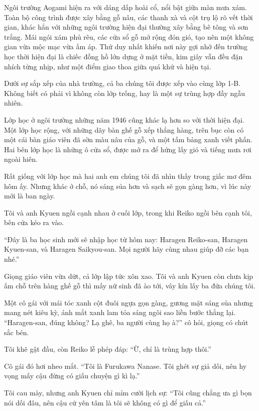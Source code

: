 \documentclass[../main.tex]{subfiles}
\begin{document}
Ngôi trường Aogami hiện ra với dáng dấp hoài cổ, nổi bật giữa màn mưa xám. Toàn bộ công trình được xây bằng gỗ nâu, các thanh xà và cột trụ lộ rõ vết thời gian, khác hẳn với những ngôi trường hiện đại thường xây bằng bê tông và sơn trắng. Mái ngói xám phủ rêu, các cửa sổ gỗ mở rộng đón gió, tạo nên một không gian vừa mộc mạc vừa ấm áp. Thứ duy nhất khiến nơi này gợi nhớ đến trường học thời hiện đại là chiếc đồng hồ lớn dựng ở mặt tiền, kim giây vẫn đều đặn nhích từng nhịp, như một điểm giao thoa giữa quá khứ và hiện tại.

Dưới sự sắp xếp của nhà trường, cả ba chúng tôi được xếp vào cùng lớp 1-B. Không biết có phải vì không còn lớp trống, hay là một sự trùng hợp đầy ngẫu nhiên.

Lớp học ở ngôi trường những năm 1946 cũng khác lạ hơn so với thời hiện đại. Một lớp học rộng, với những dãy bàn ghế gỗ xếp thẳng hàng, trên bục còn có một cái bàn giáo viên đã sờn màu nâu của gỗ, và một tấm bảng xanh viết phấn. Hai bên lớp học là những ô cửa sổ, được mở ra để hứng lấy gió và tiếng mưa rơi ngoài hiên.

Rất giống với lớp học mà hai anh em chúng tôi đã nhìn thấy trong giấc mơ đêm hôm ấy. Nhưng khác ở chỗ, nó sáng sủa hơn và sạch sẽ gọn gàng hơn, vì lúc này mới là ban ngày.

Tôi và anh Kyuen ngồi cạnh nhau ở cuối lớp, trong khi Reiko ngồi bên cạnh tôi, bên cửa kéo ra vào.

``Đây là ba học sinh mới sẽ nhập học từ hôm nay: Haragen Reiko-san, Haragen Kyuen-san, và Haragen Saikyou-san. Mọi người hãy cùng nhau giúp đỡ các bạn nhé.''

Giọng giáo viên vừa dứt, cả lớp lập tức xôn xao. Tôi và anh Kyuen còn chưa kịp ấm chỗ trên hàng ghế gỗ thì mấy nữ sinh đã ào tới, vây kín lấy ba đứa chúng tôi.

Một cô gái với mái tóc xanh cột đuôi ngựa gọn gàng, gương mặt sáng sủa nhưng mang nét kiêu kỳ, ánh mắt xanh lam tỏa sáng ngôi sao liền bước thẳng lại. ``Haragen-san, đúng không? Lạ ghê, ba người cùng họ à?'' cô hỏi, giọng có chút sắc bén.

Tôi khẽ gật đầu, còn Reiko lễ phép đáp: ``Ừ, chỉ là trùng hợp thôi.''

Cô gái đó hơi nheo mắt. ``Tôi là Furukawa Nanase. Tôi ghét sự giả dối, nên hy vọng mấy cậu đừng có giấu chuyện gì kì lạ.''

Tôi cau mày, nhưng anh Kyuen chỉ mỉm cười lịch sự: ``Tôi cũng chẳng ưa gì bọn nói dối đâu, nên cậu cứ yên tâm là tôi sẽ không có gì để giấu cả.''
\end{document}
